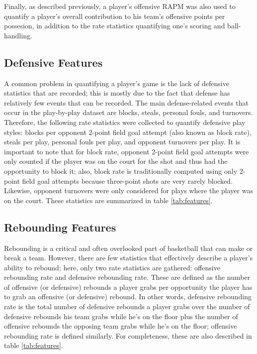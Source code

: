 Finally, as described previously, a player's offensive RAPM was also used to
quantify a player's overall contribution to his team's offensive points per
possesion, in addition to the rate statistics quantifying one's scoring and
ball-handling.

\subsection{Defensive Features}

A common problem in quantifying a player's game is the lack of defensive statistics
that are recorded; this is mostly due to the fact that defense has relatively few
events that can be recorded. The main defense-related events that occur in the
play-by-play dataset are blocks, steals, personal fouls, and turnovers. Therefore,
the following rate statistics were collected to quantify defensive play styles:
blocks per opponent 2-point field goal attempt (also known as block rate), steals
per play, personal fouls per play, and opponent turnovers per play. It is important
to note that for block rate, opponent 2-point field goal attempts were only counted
if the player was on the court for the shot and thus had the opportunity to block
it; also, block rate is traditionally computed using only 2-point field goal
attempts because three-point shots are very rarely blocked. Likewise, opponent
turnovers were only considered for plays where the player was on the court. These
statistics are summarized in table \ref{tab:features}.

\subsection{Rebounding Features}

Rebounding is a critical and often overlooked part of basketball that can make or
break a team. However, there are few statistics that effectively describe a player's
ability to rebound; here, only two rate statistics are gathered: offensive
rebounding rate and defensive rebounding rate. These are defined as the number of
offensive (or defensive) rebounds a player grabs per opportunity the player has to
grab an offensive (or defensive) rebound. In other words, defensive rebounding rate
is the total number of defensive rebounds a player grabs over the number of
defensive rebounds his team grabs while he's on the floor plus the number of
offensive rebounds the opposing team grabs while he's on the floor; offensive
rebounding rate is defined similarly. For completeness, these are also described in
table \ref{tab:features}.

